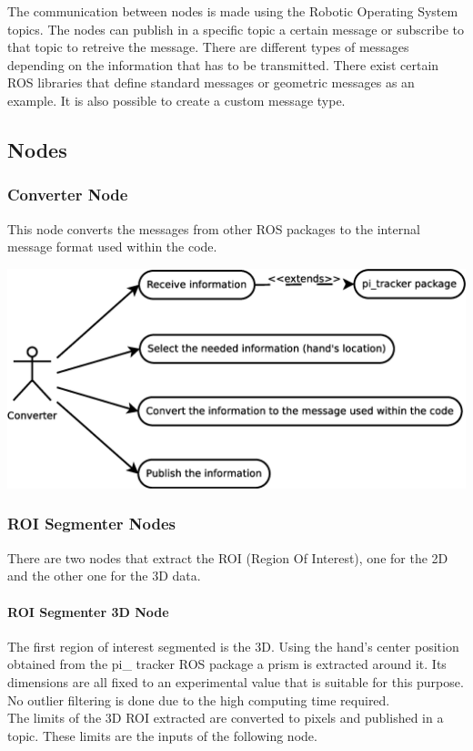 \documentclass{article}
\begin{document}
The communication between nodes is made using the Robotic Operating System topics. The nodes can publish in a specific topic a certain message or subscribe to that topic to retreive the message. 
There are different types of messages depending on the information that has to be transmitted. There exist certain ROS libraries that define standard messages or geometric messages as an example. It is also possible to create a custom message type. 


\subsection{Nodes}

\subsubsection{Converter Node}

This node converts the messages from other ROS packages to the internal message format used within the code. 

\begin{center}
	\includegraphics[scale=0.4]{img/diagrams/uc_converter.eps}
\end{center}
	
\subsubsection{ROI Segmenter Nodes}
There are two nodes that extract the ROI (Region Of Interest), one for the 2D and the other one for the 3D data.

\paragraph {ROI Segmenter 3D Node\\[0.5cm]}

The first region of interest segmented is the 3D. Using the hand's center position obtained from the pi\_ tracker ROS package a prism is extracted around it. Its dimensions are all fixed to an experimental value that is suitable for this purpose. 
\\
No outlier filtering is done due to the high computing time required.  
\\
The limits of the 3D ROI extracted are converted to pixels and published in a topic. These limits are the inputs of the following node. 
\end{document}
